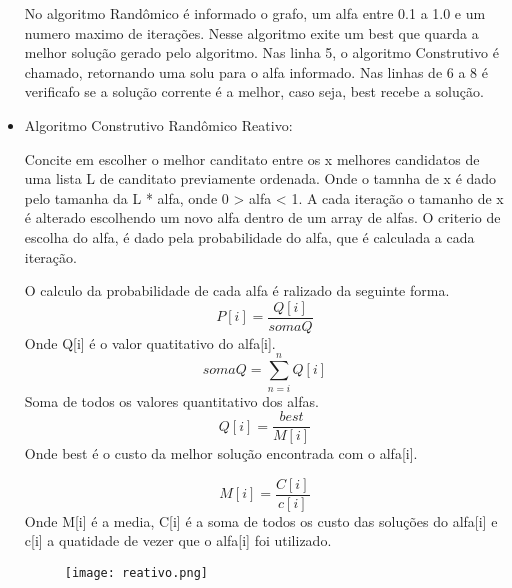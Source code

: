\documentclass[12pt, fleqn]{article}
\begin{document}
\begin{itemize}
	      \par No algoritmo Randômico é informado o grafo, um alfa entre 0.1 a 1.0 e um numero maximo de iterações.
		  Nesse algoritmo exite um best que quarda a melhor solução gerado pelo algoritmo.
		  Nas linha 5, o algoritmo Construtivo é chamado, retornando uma solu para o alfa informado.
		  Nas linhas de 6 a 8 é verificafo se a solução corrente é a melhor, caso seja, best recebe a solução.
		  
		  
	    \item Algoritmo Construtivo Randômico Reativo:
		  \par Concite em escolher o melhor canditato entre os x melhores candidatos de uma lista L de canditato previamente ordenada.
		       Onde o tamnha de x é dado pelo tamanha da L * alfa, onde 0 > alfa < 1. 
		       A cada iteração o tamanho de x é alterado escolhendo um novo alfa dentro de um array de alfas.
		       O criterio de escolha do alfa, é dado pela probabilidade do alfa, que é calculada a cada iteração.
		  \par O calculo da probabilidade de cada alfa é ralizado da seguinte forma.
		    \begin{equation}
			P[i] = \frac{Q[i]} {somaQ}			
		    \end{equation}
		    Onde Q[i] é o valor quatitativo do alfa[i].
		    \begin{equation}
		     somaQ = {\sum_{n=i}^{n} Q[i]} 
		    \end{equation}
		    Soma de todos os valores quantitativo dos alfas.		    
		    \begin{equation}
		      Q[i] = \frac{best}{M[i]}
		    \end{equation}
		    Onde best é o custo da melhor solução encontrada com o alfa[i].		    
		  
		    \newpage
		    
		    \begin{equation}
		      M[i] = \frac {C[i]}{c[i]}
		    \end{equation}		    
		    Onde M[i] é a media, C[i] é a soma de todos os custo das soluções do alfa[i] e c[i] a quatidade de vezer que o alfa[i] foi utilizado.		    
		    \\
			   
	      \begin{figure}[!htpb]
		\texttt{[image: reativo.png]}
		\label{fig:reativo}
	      \end{figure}
	      

\end{itemize}
\end{document}
